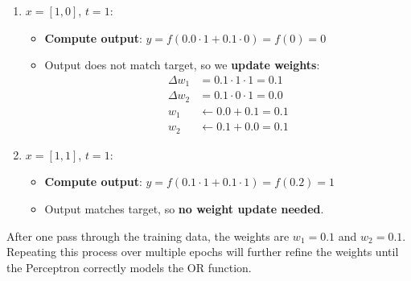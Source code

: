 \begin{examplebox}
\begin{enumerate}
\begin{itemize}
                    \begin{align*}
                        \Delta w_1 & = 0.1 \cdot 0 \cdot 1 = 0.0 \\
                        \Delta w_2 & = 0.1 \cdot 1 \cdot 1 = 0.1 \\
                        w_1 & \leftarrow 0.0 + 0.0 = 0.0 \\
                        w_2 & \leftarrow 0.0 + 0.1 = 0.1
                    \end{align*}
            \end{itemize}
        \item {} $x = [1, 0]$, $t = 1$:
            \begin{itemize}
                \item[\faIcon{cogs}] \textbf{Compute output}: $y = f(0.0 \cdot 1 + 0.1 \cdot 0) = f(0) = 0$
                \item[\textcolor{Red2}{\faIcon{times-circle}}] Output does not match target, so we \textbf{update weights}:
                    \begin{align*}
                        \Delta w_1 & = 0.1 \cdot 1 \cdot 1 = 0.1 \\
                        \Delta w_2 & = 0.1 \cdot 0 \cdot 1 = 0.0 \\
                        w_1 & \leftarrow 0.0 + 0.1 = 0.1 \\
                        w_2 & \leftarrow 0.1 + 0.0 = 0.1
                    \end{align*}
            \end{itemize}
        \item {} $x = [1, 1]$, $t = 1$:
            \begin{itemize}
                \item[\faIcon{cogs}] \textbf{Compute output}: $y = f(0.1 \cdot 1 + 0.1 \cdot 1) = f(0.2) = 1$
                \item[\textcolor{Green3}{\faIcon{check-circle}}] Output matches target, so \textbf{no weight update needed}.
            \end{itemize}
    \end{enumerate}
    After one pass through the training data, the weights are $w_1 = 0.1$ and $w_2 = 0.1$. Repeating this process over multiple epochs will further refine the weights until the Perceptron correctly models the OR function.
\end{examplebox}

